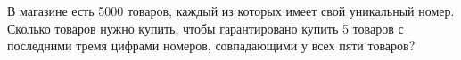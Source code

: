 \question 
В магазине есть 5000 товаров, каждый из которых имеет свой уникальный номер. Сколько товаров нужно купить, чтобы гарантировано купить 5 товаров с последними тремя цифрами номеров, совпадающими у всех пяти товаров?
